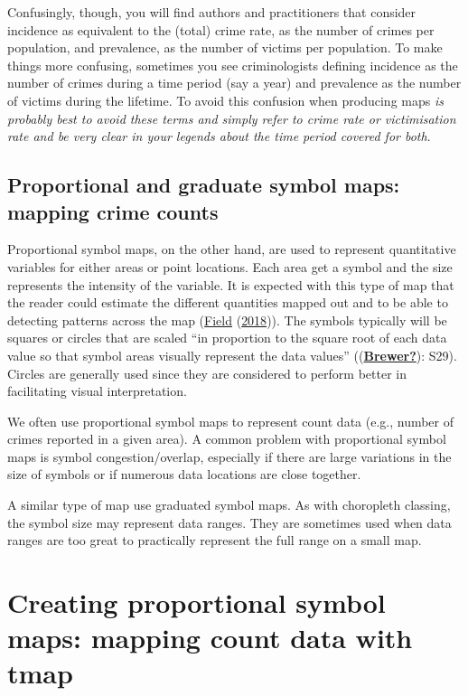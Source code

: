 \documentclass[
]{book}
\begin{document}
Confusingly, though, you will find authors and practitioners that consider incidence as equivalent to the (total) crime rate, as the number of crimes per population, and prevalence, as the number of victims per population. To make things more confusing, sometimes you see criminologists defining incidence as the number of crimes during a time period (say a year) and prevalence as the number of victims during the lifetime. To avoid this confusion when producing maps \emph{is probably best to avoid these terms and simply refer to crime rate or victimisation rate and be very clear in your legends about the time period covered for both}.

\hypertarget{proportional-and-graduate-symbol-maps-mapping-crime-counts}{%
\subsection{Proportional and graduate symbol maps: mapping crime counts}\label{proportional-and-graduate-symbol-maps-mapping-crime-counts}}

Proportional symbol maps, on the other hand, are used to represent quantitative variables for either areas or point locations. Each area get a symbol and the size represents the intensity of the variable. It is expected with this type of map that the reader could estimate the different quantities mapped out and to be able to detecting patterns across the map (\protect\hyperlink{ref-Field_2018}{Field} (\protect\hyperlink{ref-Field_2018}{2018})). The symbols typically will be squares or circles that are scaled ``in proportion to the square root of each data value so that symbol areas visually represent the data values'' ((\protect\hyperlink{ref-Brewer}{\textbf{Brewer?}}): S29). Circles are generally used since they are considered to perform better in facilitating visual interpretation.

We often use proportional symbol maps to represent count data (e.g., number of crimes reported in a given area). A common problem with proportional symbol maps is symbol congestion/overlap, especially if there are large variations in the size of symbols or if numerous data locations are close together.

A similar type of map use graduated symbol maps. As with choropleth classing, the symbol size may represent data ranges. They are sometimes used when data ranges are too great to practically represent the full range on a small map.

\hypertarget{creating-proportional-symbol-maps-mapping-count-data-with-tmap}{%
\section{Creating proportional symbol maps: mapping count data with tmap}\label{creating-proportional-symbol-maps-mapping-count-data-with-tmap}}
\end{document}
